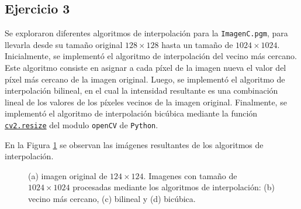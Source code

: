 \documentclass[11pt, twocolumn]{article}
\begin{document}
\subsection*{Ejercicio 3}
Se exploraron diferentes algoritmos de interpolación para la \texttt{ImagenC.pgm}, para llevarla desde su tamaño original $128 \times 128$ hasta un tamaño de $1024 \times 1024$. Inicialmente, se implementó el algoritmo de interpolación del vecino más cercano. Este algoritmo consiste en asignar a cada píxel de la imagen nueva el valor del píxel más cercano de la imagen original. Luego, se implementó el algoritmo de interpolación bilineal, en el cual la intensidad resultante es una combinación lineal de los valores de los píxeles vecinos de la imagen original. Finalmente, se implementó el algoritmo de interpolación bicúbica mediante la función \href{https://docs.opencv.org/3.4/da/d54/group__imgproc__transform.html#ga47a974309e9102f5f08231edc7e7529d}{\texttt{cv2.resize}} del modulo \texttt{openCV} de \texttt{Python}. 

En la Figura \ref{fig:figuras_ej_3} se observan las imágenes resultantes de los algoritmos de interpolación.

\begin{figure}[htbp]
  \centering
  \hfill
  \hfill
  \hfill
  \hfill
  \caption{(a) imagen original de $124 \times 124$. Imagenes con tamaño de $1024 \times 1024$ procesadas mediante los algoritmos de interpolación: (b) vecino más cercano, (c) bilineal y (d) bicúbica.}
  \label{fig:figuras_ej_3}
\end{figure}
\end{document}
